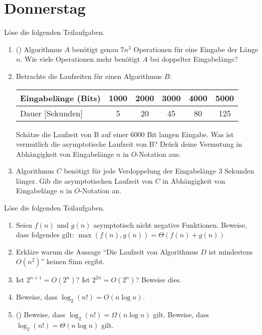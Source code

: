 \documentclass{uebung_cs}
\begin{document}
\section*{Donnerstag}

\begin{aufgabe}[Verdopplungen]
	Löse die folgenden Teilaufgaben.
	\begin{enumerate}
		\item (\warmup) Algorithmus $A$ benötigt genau $7n^3$ Operationen für eine Eingabe der Länge $n$.
		Wie viele Operationen mehr benötigt $A$ bei doppelter Eingabelänge?
		\item Betrachte die Laufzeiten für einen Algorithmus $B$:
		\begin{table}[h!]
		\centering
		\begin{tabular}{lccccc}
			Eingabelänge (Bits) & 1000 & 2000 & 3000 & 4000 & 5000\\
			\midrule
			Dauer [Sekunden] & 5 & 20 & 45 & 80 & 125 \\
		\end{tabular}
		\end{table}
		
		Schätze die Laufzeit von B auf einer 6000 Bit langen Eingabe.
		Was ist vermutlich die asymptotische Laufzeit von B? Drück deine Vermutung in Abhängigkeit von Eingabelänge $n$ in $O$-Notation aus.
		\item Algorithmus $C$ benötigt für jede Verdoppelung der Eingabelänge 3 Sekunden länger. 
		Gib die asymptotischen Laufzeit von $C$ in Abhängigkeit von Eingabelänge $n$ in $O$-Notation an.
	\end{enumerate}
\end{aufgabe}

\begin{aufgabe}
	Löse die folgenden Teilaufgaben.
	\begin{enumerate}
		\item Seien $f(n)$ und $g(n)$ asymptotisch nicht negative Funktionen.
		Beweise, dass folgendes gilt: $\max(f(n),g(n)) = \Theta(f(n) + g(n))$
		\item Erkläre warum die Aussage \enquote{Die Laufzeit von Algorithmus $D$ ist mindestens $O(n^2)$} keinen Sinn ergibt.
		\item Ist $2^{n+1} = O(2^n)$? Ist $2^{2n} = O(2^n)$? Beweise dies.
		\item Beweise, dass $\log_2(n!) = O(n \log n)$.
		\item (\hard) Beweise, dass $\log_2(n!) = \Omega(n\log n)$ gilt.
		Beweise, dass $\log_2(n!) = \Theta(n\log n)$ gilt.
	\end{enumerate}
\end{aufgabe}
\end{document}

